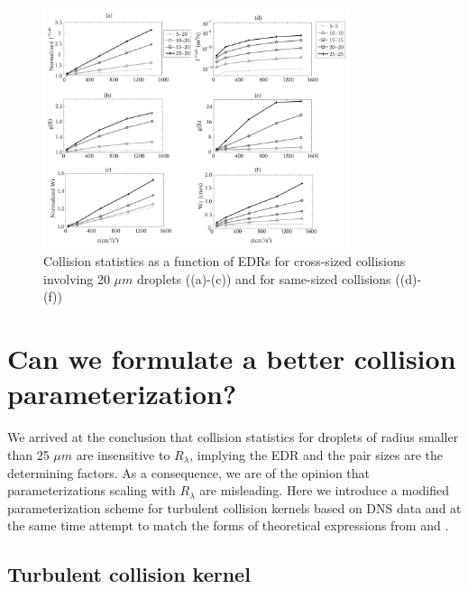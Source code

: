 \begin{figure}[ht]
\centering
\includegraphics[width=0.8\textwidth]{Figures/Chap2/diss_cs_20_self.jpg} \caption{Collision statistics as a function of EDRs for cross-sized collisions involving 20 $\mu m$ droplets ((a)-(c)) and for same-sized collisions ((d)-(f)) } \label{fig:diss_cs_20_self}
\end{figure}

\section{Can we formulate a better collision parameterization?} \label{sec:ch2_parameterization}

We arrived at the conclusion that collision statistics for droplets of radius smaller than 25 $\mu m$ are insensitive to $R_\lambda$, implying the EDR and the pair sizes are the determining factors. As a consequence, we are of the opinion that parameterizations scaling with $R_\lambda$ are misleading. Here we introduce a modified parameterization scheme for turbulent collision kernels based on DNS data and at the same time attempt to match the forms of theoretical expressions from \citet{Saffman1956} and \citet{Wang1998b}.

\subsection{Turbulent collision kernel}

